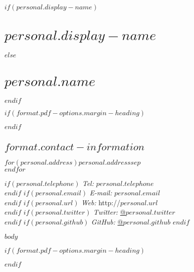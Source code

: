 \documentclass[%
  $if(format.pdf-options.papersize)$
    $format.pdf-options.papersize$paper,
  $endif$
  $format.pdf-options.typesize$,
  oneside
  ]{memoir}
\let\oldsection\section
\renewcommand{\section}[1]{%
  \oldsection*{#1}
  \leavevmode
  \par
  \vspace{\dimexpr-\baselineskip-\parskip}
}
\begin{document}
  $if(personal.display-name)$
    \chapter*{$personal.display-name$}
  $else$
    \chapter*{$personal.name$}
  $endif$

$if(format.pdf-options.margin-heading)$
  \begin{adjustwidth*}{9em}{0em}
  \mbox{}
$endif$

  \hypertarget{contact-information}{
  \section{$format.contact-information$}\label{contact-information}}
    \begin{minipage}[t]{0.3\textwidth}
      $for(personal.address)$$personal.address$$sep$\\ $endfor$
    \end{minipage}
    \begin{minipage}[t]{0.7\textwidth}
        $if(personal.telephone)$
        {\textit{Tel:}} $personal.telephone$ \\
        $endif$
        $if(personal.email)$
        {\textit{E-mail:}} $personal.email$ \\
        $endif$
        $if(personal.url)$
        {\textit{Web:}} http://$personal.url$ \\
        $endif$
        $if(personal.twitter)$
        {\textit{Twitter:}} \href{http://twitter.com/$personal.twitter$}{@$personal.twitter$} \\
        $endif$
        $if(personal.github)$
        {\textit{GitHub:}} \href{http://github.com/$personal.github$}{@$personal.github$}
        $endif$
    \end{minipage}
\vspace{-\baselineskip} %
$body$

$if(format.pdf-options.margin-heading)$
  \end{adjustwidth*}
$endif$
\end{document}

